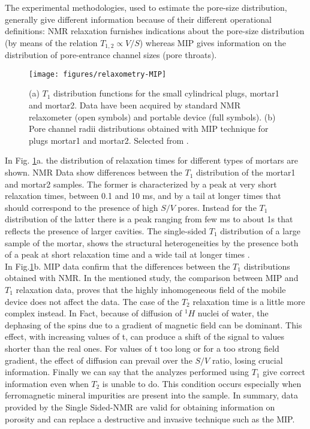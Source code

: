 \documentclass[a4paper,11pt]{report}
\begin{document}
 The experimental methodologies, used to estimate the pore-size distribution, generally give different information because of their different operational definitions: NMR relaxation furnishes indications about the pore-size distribution (by means of the relation $T_{1,2} \propto V/S$) whereas MIP gives information on the distribution of pore-entrance channel sizes (pore throats).\\
\begin{figure}[h] 

\centering
\texttt{[image: figures/relaxometry-MIP]}
\caption{(a) $T_1$ distribution functions for the small cylindrical plugs, mortar1 and mortar2. Data have been acquired by standard NMR relaxometer (open symbols) and portable device (full symbols). (b) Pore channel radii distributions obtained with MIP technique for plugs mortar1 and mortar2. Selected from \cite{due}. }\label{relaxometry-MIP}
\end{figure}
In Fig. \ref{relaxometry-MIP}a. the distribution of relaxation times for different types of mortars are shown. NMR Data show differences between the $T_1$ distribution of the mortar1 and mortar2 samples. The former is characterized by a peak at very short relaxation times, between 0.1 and 10 ms, and by a tail at longer times that should correspond to the presence of high $S/V$ pores. Instead for the $T_1$ distribution of the latter there is a peak ranging from few ms to about 1s that reflects the presence of larger cavities. The single-sided $T_1$ distribution of a large sample of the mortar, shows the structural heterogeneities by the presence both of a peak at short relaxation time and a wide tail at longer times \cite{due}. \\
In Fig.\ref{relaxometry-MIP}b. MIP data confirm that the differences between the $T_1$ distributions obtained with NMR. In the mentioned study, the comparison between MIP and $T_1$ relaxation data, proves that the highly inhomogeneous field of the mobile device does not affect the data. The case of the $T_2$ relaxation time is a little more complex instead. In Fact, because of diffusion of $^1H$ nuclei of water, the dephasing of the spins due to a gradient of magnetic field can be dominant. This effect, with increasing values of t, can produce a shift of the signal to values shorter than the real ones. For values of t too long or for a too strong field gradient, the effect of diffusion can prevail over the $S/V$ ratio, losing crucial information. Finally we can say that the analyzes performed using $T_1$ give correct information even when $T_2$ is unable to do. This condition occurs especially when ferromagnetic mineral impurities are present into the sample. In summary, data provided by the Single Sided-NMR are valid for obtaining information on porosity and can replace a destructive and invasive technique such as the MIP.\\
\end{document}
